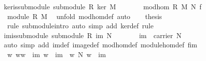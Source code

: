 \begin{isabellebody}
\endisatagproof
{\isafoldproof}%
%
\isadelimproof
\isanewline
%
\endisadelimproof
\isanewline
{}\isamarkupfalse%
\ ker{\isacharunderscore}is{\isacharunderscore}submodule{\isacharcolon}\ {\isachardoublequoteopen}submodule\ R\ ker\ M{\isachardoublequoteclose}\isanewline
%
\isadelimproof
%
\endisadelimproof
%
\isatagproof
{}\isamarkupfalse%
\ {\isacharminus}\ \isanewline
\ \ \isamarkupfalse%
\ {}{\isacharcolon}\ {\isachardoublequoteopen}mod{\isacharunderscore}hom\ R\ M\ N\ f{\isachardoublequoteclose}\isacommand{{\isachardot}{\isachardot}}\isamarkupfalse%
\isanewline
\ \ \isamarkupfalse%
\ {}\ \isamarkupfalse%
\ {}{\isacharcolon}\ {\isachardoublequoteopen}module\ R\ M{\isachardoublequoteclose}\ \isamarkupfalse%
\ {\isacharparenleft}unfold\ mod{\isacharunderscore}hom{\isacharunderscore}def{\isacharcomma}\ auto{\isacharparenright}\isanewline
\ \ \isamarkupfalse%
\ {\isacharquery}thesis\isanewline
\ \ \ \ \isamarkupfalse%
\ \ {\isacharparenleft}rule\ submodule{\isachardot}intro{\isacharcomma}\ auto\ simp\ add{\isacharcolon}\ ker{\isacharunderscore}def{\isacharcomma}\ rule\ {}{\isacharparenright}\ \isanewline
{}\isamarkupfalse%
%
\endisatagproof
{\isafoldproof}%
%
\isadelimproof
\isanewline
%
\endisadelimproof
\isanewline
{}\isamarkupfalse%
\ im{\isacharunderscore}is{\isacharunderscore}submodule{\isacharcolon}\ {\isachardoublequoteopen}submodule\ R\ im\ N{\isachardoublequoteclose}\isanewline
%
\isadelimproof
%
\endisadelimproof
%
\isatagproof
{}\isamarkupfalse%
\ {\isacharminus}\ \isanewline
\ \ \isamarkupfalse%
\ {}{\isacharcolon}\ {\isachardoublequoteopen}im\ {\isasymsubseteq}\ carrier\ N{\isachardoublequoteclose}\ \isamarkupfalse%
\ {\isacharparenleft}auto\ simp\ add{\isacharcolon}\ im{\isacharunderscore}def\ image{\isacharunderscore}def\ mod{\isacharunderscore}hom{\isacharunderscore}def\ module{\isacharunderscore}hom{\isacharunderscore}def\ f{\isacharunderscore}im{\isacharparenright}\ \isanewline
\ \ \isamarkupfalse%
\ {}{\isacharcolon}\ {\isachardoublequoteopen}{\isasymAnd}w{}\ w{}{\isachardot}{\isasymlbrakk}w{}\ {\isasymin}\ im{\isacharsemicolon}\ w{}\ {\isasymin}\ im{\isasymrbrakk}\ {\isasymLongrightarrow}\ w{}\ {\isasymoplus}\isactrlbsub N\isactrlesub \ w{}\ {\isasymin}\ im{\isachardoublequoteclose}\ \isanewline

\end{isabellebody}
